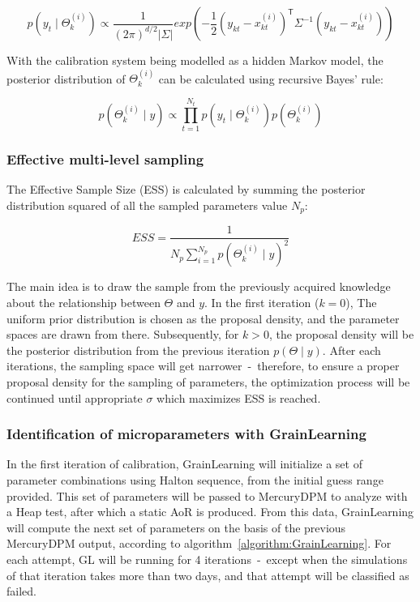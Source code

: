 \begin{equation} \label{eq:likelihood}
p(y_t \mid \Theta_{k}^{(i)}) \propto \frac{1}{(2\pi)^{d/2}|\Sigma|}exp\left(-\frac{1}{2}(y_{kt} - x^{(i)}_{kt})^{\mathsf{T}}\Sigma^{-1}(y_{kt} - x^{(i)}_{kt} )\right)
\end{equation}

With the calibration system being modelled as a hidden Markov model, the posterior distribution of $\Theta_{k}^{(i)}$ can be calculated using recursive Bayes' rule: 

\begin{equation} \label{eq:posterior}
    p(\Theta_{k}^{(i)} \mid y) \propto \prod_{t=1}^{N_{t}} p(y_t \mid \Theta_{k}^{(i)} )p( \Theta_{k}^{(i)} ) 
\end{equation}

\subsubsection{Effective multi-level sampling}

The Effective Sample Size (ESS) is calculated by summing the posterior distribution squared of all the sampled parameters value $N_{p}$:

\begin{equation} \label{eq:ESS}
ESS = \frac{1}{N_{p} \sum_{i=1}^{N_{p}} p(\Theta_{k}^{(i)} \mid y)^2}
\end{equation}

The main idea is to draw the sample from the previously acquired knowledge about the relationship between $\Theta$ and $y$. In the first iteration ($k = 0$), The uniform prior distribution is chosen as the proposal density, and the parameter spaces are drawn from there. Subsequently, for $k > 0$, the proposal density will be the posterior distribution from the previous iteration $p(\Theta \mid y)$. After each iterations, the sampling space will get narrower~-~therefore, to ensure a proper proposal density for the sampling of parameters, the optimization process will be continued until appropriate $\sigma$ which maximizes ESS is reached. 

\subsubsection{Identification of microparameters with GrainLearning}
In the first iteration of calibration, GrainLearning will initialize a set of parameter combinations using Halton sequence, from the initial guess range provided. This set of parameters will be passed to MercuryDPM to analyze with a Heap test, after which a static AoR is produced. From this data, GrainLearning will compute the next set of parameters on the basis of the previous MercuryDPM output, according to algorithm~\ref{algorithm:GrainLearning}. For each attempt, GL will be running for 4 iterations~-~except when the simulations of that iteration takes more than two days, and that attempt will be classified as failed. 




    